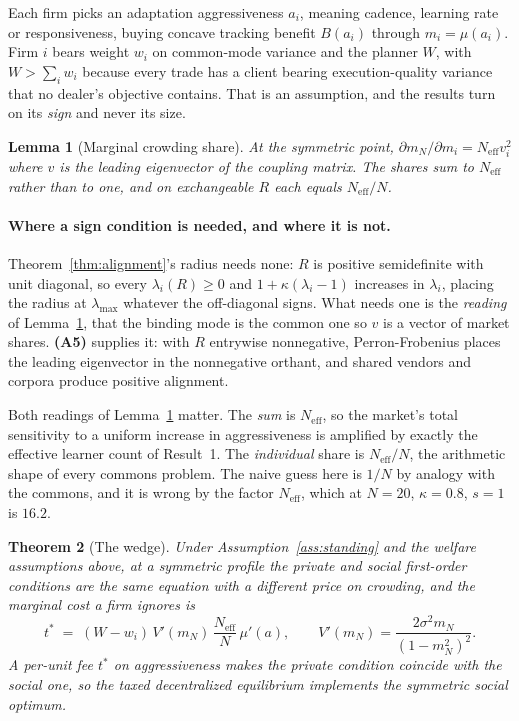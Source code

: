 \documentclass{article}
\theoremstyle{plain}
\newtheorem{theorem}{Theorem}
\newtheorem{lemma}[theorem]{Lemma}
\theoremstyle{definition}
\newcommand{\Neff}{N_{\mathrm{eff}}}
\newcommand{\mN}{m_N}
\newcommand{\lmax}{\lambda_{\max}}
\begin{document}
Each firm picks an adaptation aggressiveness $a_i$, meaning cadence, learning rate or responsiveness, buying concave tracking benefit $B(a_i)$ through $m_i = \mu(a_i)$. Firm $i$ bears weight $w_i$ on common-mode variance and the planner $W$, with $W > \sum_i w_i$ because every trade has a client bearing execution-quality variance that no dealer's objective contains. That is an assumption, and the results turn on its \emph{sign} and never its size.

\begin{lemma}[Marginal crowding share]
\label{lem:share}
At the symmetric point, $\partial \mN/\partial m_i = \Neff v_i^2$ where $v$ is the leading eigenvector of the coupling matrix. The shares sum to $\Neff$ rather than to one, and on exchangeable $R$ each equals $\Neff/N$.
\end{lemma}

\paragraph{Where a sign condition is needed, and where it is not.}
Theorem~\ref{thm:alignment}'s radius needs none: $R$ is positive semidefinite with unit diagonal, so every $\lambda_i(R)\ge 0$ and $1+\kappa(\lambda_i-1)$ increases in $\lambda_i$, placing the radius at $\lmax$ whatever the off-diagonal signs. What needs one is the \emph{reading} of Lemma~\ref{lem:share}, that the binding mode is the common one so $v$ is a vector of market shares. \textbf{(A5)} supplies it: with $R$ entrywise nonnegative, Perron-Frobenius places the leading eigenvector in the nonnegative orthant, and shared vendors and corpora produce positive alignment.

Both readings of Lemma~\ref{lem:share} matter. The \emph{sum} is $\Neff$, so the market's total sensitivity to a uniform increase in aggressiveness is amplified by exactly the effective learner count of Result~1. The \emph{individual} share is $\Neff/N$, the arithmetic shape of every commons problem. The naive guess here is $1/N$ by analogy with the commons, and it is wrong by the factor $\Neff$, which at $N=20$, $\kappa=0.8$, $s=1$ is $16.2$.

\begin{theorem}[The wedge]
\label{thm:wedge}
Under Assumption~\ref{ass:standing} and the welfare assumptions above, at a symmetric profile the private and social first-order conditions are the same equation with a different price on crowding, and the marginal cost a firm ignores is
\begin{equation}
t^{*} \;=\; (W - w_i)\, V'(\mN)\, \frac{\Neff}{N}\, \mu'(a), \qquad V'(\mN) = \frac{2\sigma^2 \mN}{(1-\mN^2)^2}.
\end{equation}
A per-unit fee $t^{*}$ on aggressiveness makes the private condition coincide with the social one, so the taxed decentralized equilibrium implements the symmetric social optimum.
\end{theorem}
\end{document}
